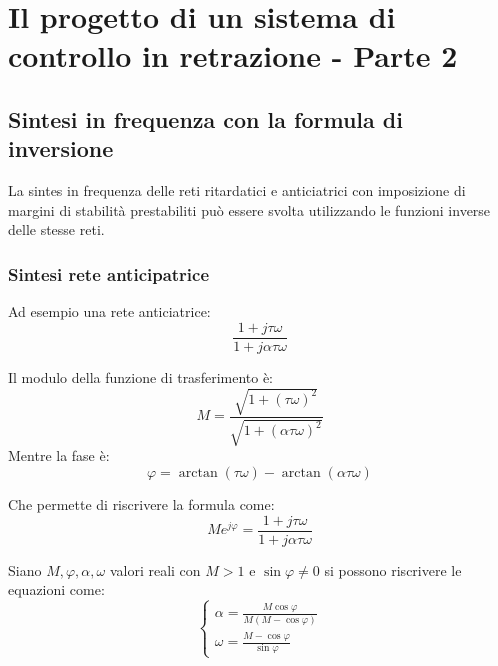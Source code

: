 \section{Il progetto di un sistema di controllo in retrazione - Parte 2}


\subsection{Sintesi in frequenza con la formula di inversione}


La sintes in frequenza delle reti ritardatici e anticiatrici con imposizione 
di margini di stabilità prestabiliti può essere svolta utilizzando le funzioni 
inverse delle stesse reti.
\subsubsection{Sintesi rete anticipatrice}
Ad esempio una rete anticiatrice:
\begin{equation}
  \frac{1 + j \tau \omega}{1 + j \alpha \tau \omega}
\end{equation}

Il modulo della funzione di trasferimento è:
\begin{equation}
  M = \frac{\sqrt{1 + (\tau \omega)^2}}{\sqrt{1 + (\alpha \tau \omega)^2}}
\end{equation}
Mentre la fase è:
\begin{equation}
  \varphi = \arctan(\tau \omega) - \arctan(\alpha \tau \omega)
\end{equation}

Che permette di riscrivere la formula come:
\begin{equation}
  M e^{j \varphi} = \frac{1 + j \tau \omega}{1 + j \alpha \tau \omega}
\end{equation}

Siano $M, \varphi, \alpha, \omega$ valori reali con $M > 1$ e $\sin \varphi \neq 0$ 
si possono riscrivere le equazioni come:
\begin{equation}
  \begin{cases}
    \alpha = \frac{M \cos \varphi}{M(M - \cos \varphi)} \\
    \omega = \frac{M - \cos \varphi}{\sin \varphi}
  \end{cases}
\end{equation}


